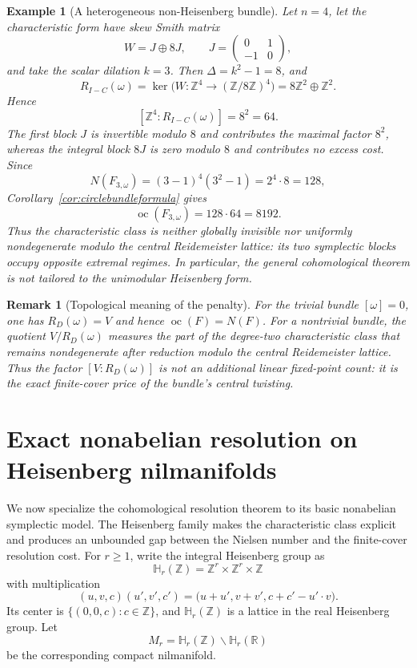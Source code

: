 \documentclass[11pt]{article}
\newtheorem{remark}[theorem]{Remark}
\newtheorem{example}[theorem]{Example}
\DeclareMathOperator{\oc}{oc}
\newcommand{\Z}{\mathbb Z}
\newcommand{\R}{\mathbb R}
\newcommand{\Heis}{\mathbb H}
\begin{document}
\begin{example}[A heterogeneous non-Heisenberg bundle]
\label{ex:heterogeneousbundle}
Let \(n=4\), let the characteristic form have skew Smith matrix
\[
  W=J\oplus 8J,
  \qquad
  J=\begin{pmatrix}0&1\\-1&0\end{pmatrix},
\]
and take the scalar dilation \(k=3\).  Then \(\Delta=k^2-1=8\), and
\[
  R_{I-C}(\omega)
  =\ker\bigl(W\colon\Z^4\to(\Z/8\Z)^4\bigr)
  =8\Z^2\oplus\Z^2.
\]
Hence
\[
  [\Z^4:R_{I-C}(\omega)]=8^2=64.
\]
The first block \(J\) is invertible modulo \(8\) and contributes the maximal
factor \(8^2\), whereas the integral block \(8J\) is zero modulo \(8\) and
contributes no excess cost.  Since
\[
  N(F_{3,\omega})=(3-1)^4(3^2-1)=2^4\cdot8=128,
\]
Corollary~\ref{cor:circlebundleformula} gives
\[
  \boxed{\oc(F_{3,\omega})=128\cdot64=8192.}
\]
Thus the characteristic class is neither globally invisible nor uniformly
nondegenerate modulo the central Reidemeister lattice: its two symplectic
blocks occupy opposite extremal regimes.  In particular, the general
cohomological theorem is not tailored to the unimodular Heisenberg form.
\end{example}

\begin{remark}[Topological meaning of the penalty]
\label{rem:topologicalpenalty}
For the trivial bundle $[\omega]=0$, one has
$R_D(\omega)=V$ and hence $\oc(F)=N(F)$.  For a nontrivial bundle, the
quotient $V/R_D(\omega)$ measures the part of the degree-two characteristic
class that remains nondegenerate after reduction modulo the central
Reidemeister lattice.  Thus the factor $[V:R_D(\omega)]$ is not an
additional linear fixed-point count: it is the exact finite-cover price of the
bundle's central twisting.
\end{remark}


\section{Exact nonabelian resolution on Heisenberg nilmanifolds}
\label{sec:heisenberg}

We now specialize the cohomological resolution theorem to its basic
nonabelian symplectic model.  The Heisenberg family makes the characteristic
class explicit and produces an unbounded gap between the Nielsen number and
the finite-cover resolution cost.
For $r\ge1$, write the integral Heisenberg group as
\[
  \Heis_r(\Z)=\Z^r\times\Z^r\times\Z
\]
with multiplication
\[
  (u,v,c)(u',v',c')
  =\bigl(u+u',v+v',c+c'-u'\!\cdot v\bigr).
\]
Its center is $\{(0,0,c):c\in\Z\}$, and
$\Heis_r(\Z)$ is a lattice in the real Heisenberg group.  Let
\[
  M_r=\Heis_r(\Z)\backslash\Heis_r(\R)
\]
be the corresponding compact nilmanifold.
\end{document}
